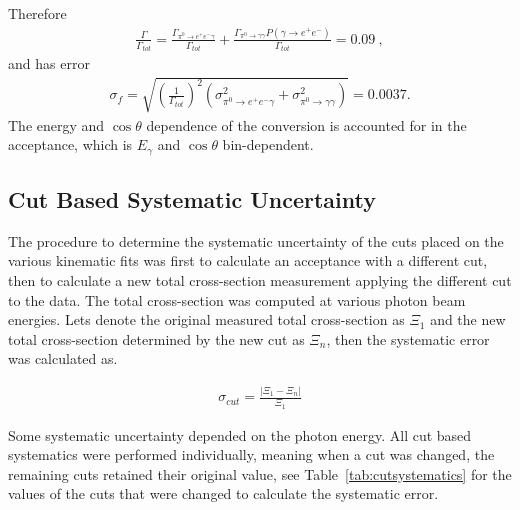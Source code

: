  	Therefore
 	\begin{align}
 		\frac{\Gamma}{\Gamma_{tot}} = \frac{\Gamma_{\pi^{0}\rightarrow e^{+}e^{-}\gamma}}{\Gamma_{tot}} + \frac{\Gamma_{\pi^{0}\rightarrow \gamma \gamma}P(\gamma \to  e^{+}e^{-})}{\Gamma_{tot}} = 0.09 \ ,
 	\end{align}
 	and has error
 	\begin{align}
 		\sigma_f = \sqrt{\left(\frac{1}{\Gamma_{tot}}\right)^2(\sigma^2_{\pi^{0}\rightarrow e^{+}e^{-}\gamma} + \sigma^2_{\pi^{0}\rightarrow \gamma \gamma})  } = 0.0037.  
 	\end{align}
 	The energy and $\cos \theta$ dependence of the conversion is accounted for in the acceptance, which is $E_\gamma$ and $\cos \theta$ bin-dependent. 
 	
 	
 	
 	\subsection{Cut Based Systematic Uncertainty}
 	The procedure to determine the systematic uncertainty of the cuts placed on the various kinematic fits was first to calculate an acceptance with a different cut, then to calculate a new total cross-section measurement applying the different cut to the data. The total cross-section was computed at various photon beam energies. Lets denote the original measured total cross-section as $\Xi_1$ and the new total cross-section determined by the new cut as $\Xi_n$, then the systematic error was calculated as.
 	
 	\begin{align}
 		\sigma_{cut} = \frac{\left| \Xi_1 - \Xi_n \right|}{\Xi_1}
 	\end{align}
 	
 	Some systematic uncertainty depended on the photon energy. All cut based systematics were performed individually, meaning when a cut was changed, the remaining cuts retained their original value, see Table~\ref{tab:cutsystematics} for the values of the cuts that were changed to calculate the systematic error.
 	
 	

